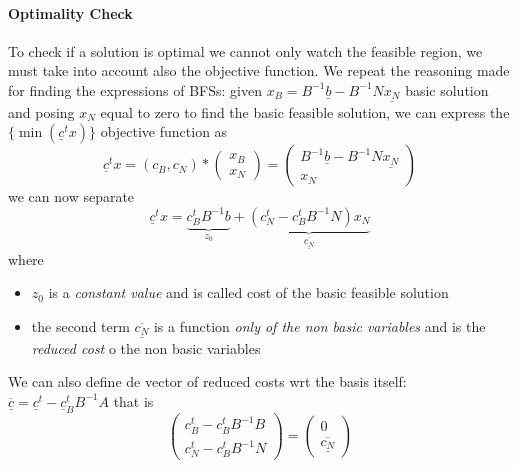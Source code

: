            \paragraph{Optimality Check}
                To check if a solution is optimal we cannot only watch the feasible region, we must take into account also the objective function. We repeat the reasoning made for finding the expressions of BFSs: given $x_B = B^{-1}\underline{b} - B^{-1}N\underline{x_N}$ basic solution and posing $x_N$ equal to zero to find the basic feasible solution, we can express the $\{\min(\underline{c}^tx)\}$ objective function as
                \begin{equation}
                    \underline{c}^tx = (c_B, c_N) * \begin{pmatrix} x_B \\ x_N \end{pmatrix} = 
                        \begin{pmatrix}
                            B^{-1}\underline{b} - B^{-1}N\underline{x_N} \\
                            x_N
                        \end{pmatrix}
                \end{equation}
                we can now separate
                \begin{equation}
                    \underline{c}^tx = \underbrace{c_B^tB^{-1}b}_{z_0} + \underbrace{(c_N^t - c_B^tB^{-1}N)x_N}_{\underline{\overline{c_N}}}
                \end{equation}
                where
                \begin{itemize}
                    \item $z_0$ is a \textit{constant value} and is called cost of the basic feasible solution
                    \item the second term $\underline{\overline{c_N}}$ is a function \textit{only of the non basic variables} and is the \textit{reduced cost} o the non basic variables
                \end{itemize}
                We can also define de vector of reduced costs wrt the basis itself: $\underline{\overline{c}} = \underline{c}^t -\underline{c}_B^tB^{-1}A$ that is
                \begin{equation}
                    \begin{pmatrix}
                        c_B^t - c_B^tB^{-1}B \\
                        c_N^t - c_B^tB^{-1}N
                    \end{pmatrix}
                    =
                    \begin{pmatrix}
                        0 \\
                        \underline{\overline{c_N}}
                    \end{pmatrix}
                \end{equation}
